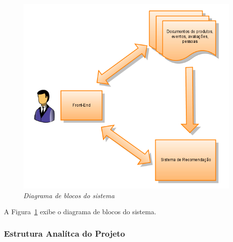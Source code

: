 \begin{figure}
  \centering
  \includegraphics[width=\textwidth]{imagens/escopo}
  \caption{\it Diagrama de blocos do sistema}
  \label{fig:escopo}
\end{figure}

A Figura~\ref{fig:escopo} exibe o diagrama de blocos do sistema.

\subsubsection{Estrutura Analítca do Projeto} %
\label{ssub:estrutura_analítca_do_projeto}

